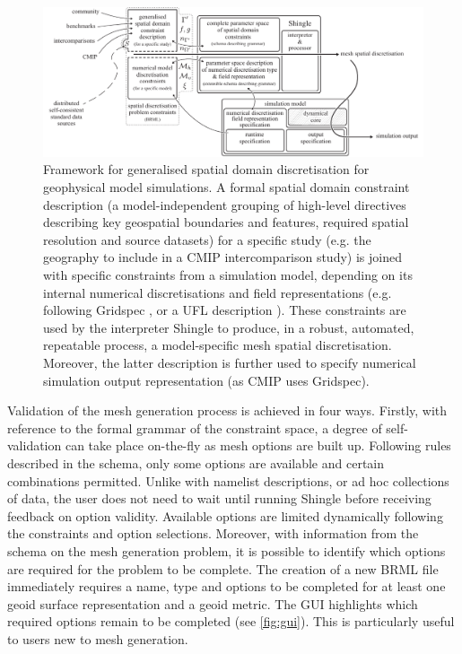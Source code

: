 \documentclass[a4paper, 10pt]{book}
\providecommand{\shingle}{Shingle\xspace}
\providecommand{\brml}{BRML\xspace}
\begin{document}
\begin{figure}[!h]
\begin{center}
\includegraphics[width=\textwidth]{fig/unified.pdf}
\end{center}
\caption{
Framework for generalised spatial domain discretisation for geophysical model simulations.
%
A formal spatial domain constraint description
(a model-independent grouping of high-level directives describing key geospatial boundaries and features, required spatial resolution and source datasets)
for a specific study (e.g. the geography to include in a CMIP intercomparison study) is
joined with specific constraints from a simulation model, depending on its internal numerical discretisations and field representations
(e.g. following Gridspec \citep{gridspec}, or a UFL description \citep{ufl}).
%
These constraints are used by the interpreter \shingle to produce, in a robust, automated, repeatable process, a model-specific mesh spatial discretisation.
Moreover, the latter description is further used to specify numerical simulation output representation
(as CMIP uses Gridspec).
}
\label{fig:unified}
\end{figure}
%
Validation of the mesh generation process is achieved in four ways.
%
Firstly, 
with reference to the formal grammar of the constraint space,
a degree of self-validation can take place on-the-fly as mesh options are built up.
Following rules described in the schema,
only some options are available
and certain combinations permitted.
%
Unlike with namelist descriptions,
or ad hoc collections of data,
%
the user does not need to wait until running \shingle before receiving feedback on option validity.
%
Available options are limited dynamically following the constraints and option selections.
Moreover, with information from the schema on the mesh generation problem, it is possible to identify which options are required for the problem to be complete.
%
The creation of a new \brml file immediately requires a name, type and options to be completed for at least one geoid surface representation and a geoid metric.
%
The GUI highlights which required options remain to be completed (see \cref{fig:gui}).
%
This is particularly useful to users new to mesh generation.
%
\end{document}
